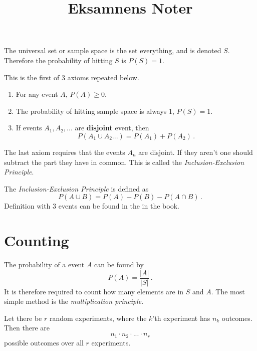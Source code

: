 \title{Eksamnens Noter}


The universal set or sample space is the set everything, and is denoted $S$.
Therefore the probability of hitting $S$ is $P(S) = 1$.

This is the first of 3 axioms repeated below.

\begin{enumerate}
    \item For any event $A$, $P(A) \geq 0$.
    \item The probability of hitting sample space is always 1, $P(S) = 1$.
    \item If events $A_1, A_2, ...$ are \textbf{disjoint} event, then
        \begin{equation}
            P(A_1 \cup A_2 ...) = P(A_1) + P(A_2)\,.
        \end{equation}
\end{enumerate}

The last axiom requires that the events $A_n$ are disjoint.
If they aren't one should subtract the part they have in common.
This is called the \emph{Inclusion-Exclusion Principle}.

\begin{principle}
    The \emph{Inclusion-Exclusion Principle} is defined as
    \begin{equation}
        P(A \cup B) = P(A) + P(B) - P(A \cap B)\,.
    \end{equation}
    Definition with 3 events can be found in the in the book.
\end{principle}

\section{Counting}

The probability of a event $A$ can be found by
\begin{equation}
    P(A) = \frac {|A|} {|S|}\,.
\end{equation}
It is therefore required to count how many elements are in $S$ and $A$.
The most simple method is the \emph{multiplication principle}.

\begin{principle}
    Let there be $r$ random experiments, where the $k$'th experiment has $n_k$ outcomes.
    Then there are
    \begin{equation}
        n_1 \cdot n_2 \cdot ... \cdot n_r
    \end{equation}
    possible outcomes over all $r$ experiments.
\end{principle}

